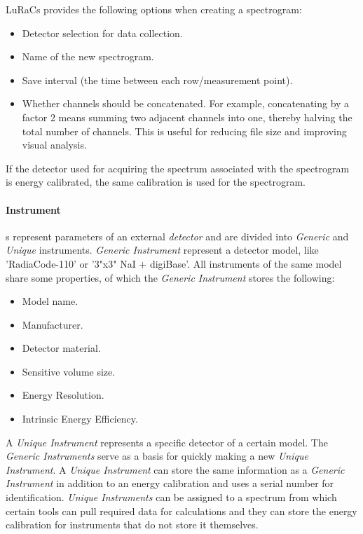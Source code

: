 LuRaCs provides the following options when creating a spectrogram:
\begin{itemize}
    \item Detector selection for data collection.
    \item Name of the new spectrogram.
    \item Save interval (the time between each row/measurement point).
    \item Whether channels should be concatenated. For example, concatenating by a factor 2 means summing two adjacent channels into one, thereby halving the total number of channels. This is useful for reducing file size and improving visual analysis.
\end{itemize}
If the detector used for acquiring the spectrum associated with the spectrogram is energy calibrated, the same calibration is used for the spectrogram.


\paragraph{Instrument}s represent parameters of an external \textit{detector} and are divided into \textit{Generic} and \textit{Unique} instruments. \textit{Generic Instrument} represent a detector model, like 'RadiaCode-110' or '3"x3" NaI + digiBase'. All instruments of the same model share some properties, of which the \textit{Generic Instrument} stores the following:
\begin{itemize}
    \item Model name.
    \item Manufacturer.
    \item Detector material.
    \item Sensitive volume size.
    \item Energy Resolution.
    \item Intrinsic Energy Efficiency.
\end{itemize}
A \textit{Unique Instrument} represents a specific detector of a certain model. The \textit{Generic Instruments} serve as a basis for quickly making a new \textit{Unique Instrument}. A \textit{Unique Instrument} can store the same information as a \textit{Generic Instrument} in addition to an energy calibration and uses a serial number for identification. \textit{Unique Instruments} can be assigned to a spectrum from which certain tools can pull required data for calculations and they can store the energy calibration for instruments that do not store it themselves.

